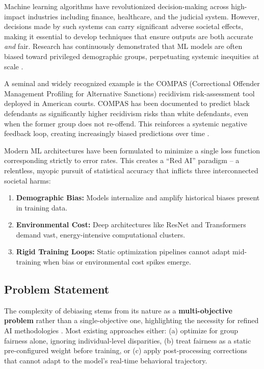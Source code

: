 \documentclass[12pt,a4paper]{article}
\begin{document}
Machine learning algorithms have revolutionized decision-making across high-impact industries including finance, healthcare, and the judicial system. However, decisions made by such systems can carry significant adverse societal effects, making it essential to develop techniques that ensure outputs are both accurate \textit{and} fair. Research has continuously demonstrated that ML models are often biased toward privileged demographic groups, perpetuating systemic inequities at scale \cite{caton2020fairness}.

A seminal and widely recognized example is the COMPAS (Correctional Offender Management Profiling for Alternative Sanctions) recidivism risk-assessment tool deployed in American courts. COMPAS has been documented to predict black defendants as significantly higher recidivism risks than white defendants, even when the former group does not re-offend. This reinforces a systemic negative feedback loop, creating increasingly biased predictions over time \cite{angwin2016machine}.

Modern ML architectures have been formulated to minimize a single loss function corresponding strictly to error rates. This creates a ``Red AI'' paradigm -- a relentless, myopic pursuit of statistical accuracy that inflicts three interconnected societal harms:

\begin{enumerate}
    \item \textbf{Demographic Bias:} Models internalize and amplify historical biases present in training data.
    \item \textbf{Environmental Cost:} Deep architectures like ResNet and Transformers demand vast, energy-intensive computational clusters.
    \item \textbf{Rigid Training Loops:} Static optimization pipelines cannot adapt mid-training when bias or environmental cost spikes emerge.
\end{enumerate}

\subsection{Problem Statement}

The complexity of debiasing stems from its nature as a \textbf{multi-objective problem} rather than a single-objective one, highlighting the necessity for refined AI methodologies \cite{rN2024multiobj}. Most existing approaches either: (a) optimize for group fairness alone, ignoring individual-level disparities, (b) treat fairness as a static pre-configured weight before training, or (c) apply post-processing corrections that cannot adapt to the model's real-time behavioral trajectory.
\end{document}
